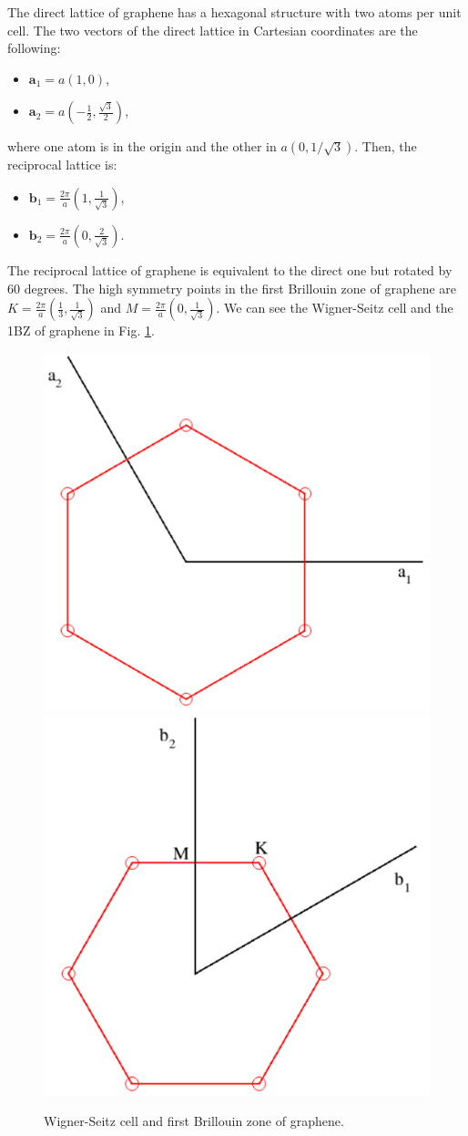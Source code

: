 The direct lattice of graphene has a hexagonal structure with two atoms per unit cell. The two vectors of the direct 
lattice in Cartesian coordinates are the following:
\begin{itemize}
 \item $\mathbf{a}_{1}=a(1,0)$,
 \item $\mathbf{a}_{2}=a\left(-\frac{1}{2},\frac{\sqrt{3}}{2}\right)$,
\end{itemize}
where one atom is in the origin and the other in $a(0,1/\sqrt{3})$. Then, the reciprocal lattice is:
\begin{itemize}
 \item $\mathbf{b}_{1}=\frac{2\pi}{a}\left(1,\frac{1}{\sqrt{3}}\right)$,
 \item $\mathbf{b}_{2}=\frac{2\pi}{a}\left(0,\frac{2}{\sqrt{3}}\right)$.
\end{itemize}
The reciprocal lattice of graphene is equivalent to the direct one but rotated by $60$ degrees. The high symmetry 
points in the first Brillouin zone of graphene are $K=\frac{2\pi}{a}\left(\frac{1}{3},\frac{1}{\sqrt{3}}\right)$ and 
$M=\frac{2\pi}{a}\left(0,\frac{1}{\sqrt{3}}\right)$. We can see the Wigner-Seitz cell and the 1BZ of graphene in 
Fig. \ref{wigner}.
\begin{figure}[htb]
\includegraphics[width=0.45\linewidth]{Figures/ws.pdf}
\includegraphics[width=0.45\linewidth]{Figures/brillouin.pdf}
\caption{Wigner-Seitz cell and first Brillouin zone of graphene.}
\label{wigner}
\end{figure}

